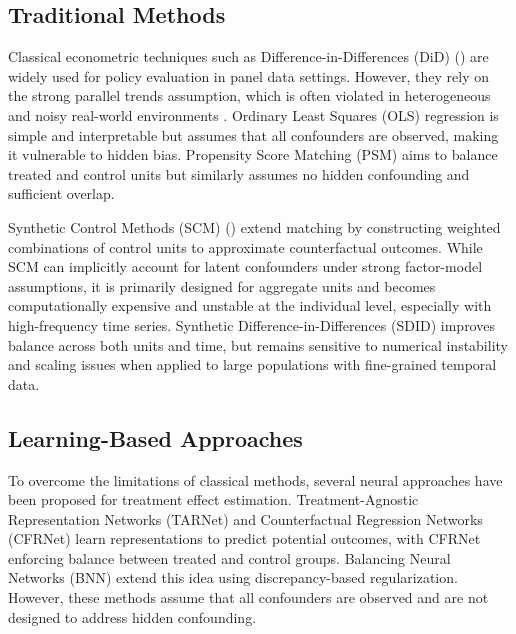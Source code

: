 \documentclass[10pt]{article} %
\begin{document}
\subsection{Traditional Methods}
Classical econometric techniques such as Difference-in-Differences (DiD)
(\citealt{angrist2009mostly, ashenfelter1984using, card1990impact, Bertrand_Duflo_Mullainathan_2004, abadie2005semiparametric})
are widely used for policy evaluation in panel data settings. However, they rely on the strong parallel trends assumption, which is often violated in heterogeneous and noisy real-world environments \citep{gibson2021measuring}. Ordinary Least Squares (OLS) regression
\citep{rubin1974estimating, angrist2009mostly}
is simple and interpretable but assumes that all confounders are observed, making it vulnerable to hidden bias. Propensity Score Matching (PSM) \citep{caliendo2008some} aims to balance treated and control units but similarly assumes no hidden confounding and sufficient overlap.

Synthetic Control Methods (SCM)
(\citealt{abadie2003economic, abadie2010synthetic, klossner2018comparative, abadie2021penalized})
extend matching by constructing weighted combinations of control units to approximate counterfactual outcomes. While SCM can implicitly account for latent confounders under strong factor-model assumptions, it is primarily designed for aggregate units and becomes computationally expensive and unstable at the individual level, especially with high-frequency time series. Synthetic Difference-in-Differences (SDID)
\citep{arkhangelsky2021synthetic, clarke2023synthetic}
improves balance across both units and time, but remains sensitive to numerical instability and scaling issues when applied to large populations with fine-grained temporal data.

\subsection{Learning-Based Approaches}
To overcome the limitations of classical methods, several neural approaches have been proposed for treatment effect estimation. Treatment-Agnostic Representation Networks (TARNet) and Counterfactual Regression Networks (CFRNet) \citep{tarnet} learn representations to predict potential outcomes, with CFRNet enforcing balance between treated and control groups. Balancing Neural Networks (BNN) \citep{bnn} extend this idea using discrepancy-based regularization. However, these methods assume that all confounders are observed and are not designed to address hidden confounding.
\end{document}
